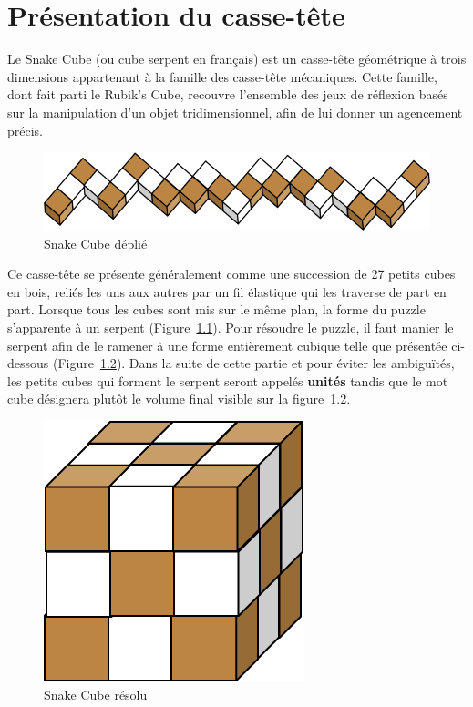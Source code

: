 \chapter{Présentation du casse-tête}
Le Snake Cube (ou cube serpent en français) est un casse-tête géométrique à trois dimensions appartenant à la famille des casse-tête mécaniques. Cette famille, dont fait parti le Rubik’s Cube, recouvre l’ensemble des jeux de réflexion basés sur la manipulation d’un objet tridimensionnel, afin de lui donner un agencement précis.

\begin{figure}[h]
 \centering
 \includegraphics[scale=0.5,keepaspectratio=true]{img/snakeCubeFlat.png}
 \caption{Snake Cube déplié}
 \label{snakeFlat}
\end{figure}

Ce casse-tête se présente généralement comme une succession de 27 petits cubes en bois, reliés les uns aux autres par un fil élastique qui les traverse de part en part. Lorsque tous les cubes sont mis sur le même plan, la forme du puzzle s’apparente à un serpent  (Figure~\ref{snakeFlat}). Pour résoudre le puzzle, il faut manier le serpent afin de le ramener à une forme entièrement cubique telle que présentée ci-dessous (Figure~\ref{snakeSolved}). Dans la suite de cette partie et pour éviter les ambiguïtés, les petits cubes qui forment le serpent seront appelés \textbf{unités} tandis que le mot cube désignera plutôt le volume final visible sur la figure~\ref{snakeSolved}.

\begin{figure}[h]
 \centering
 \includegraphics[scale=0.5,keepaspectratio=true]{img/snakeCubeSolved.png}
 \caption{Snake Cube résolu}
 \label{snakeSolved}
\end{figure}

